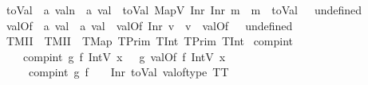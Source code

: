 \begin{isabellebody}
\isanewline
\isanewline
{}\isamarkupfalse%
\ toVal{}\ {\isacharcolon}{\kern0pt}{\isacharcolon}{\kern0pt}\ {\isachardoublequoteopen}{\isacharprime}{\kern0pt}a\ valn\ {\isasymRightarrow}\ {\isacharprime}{\kern0pt}a\ val{}{\isachardoublequoteclose}\ \ {\isachardoublequoteopen}toVal{}\ {\isacharparenleft}{\kern0pt}MapV\ {\isacharparenleft}{\kern0pt}Inr\ {\isacharparenleft}{\kern0pt}Inr\ m{\isacharparenright}{\kern0pt}{\isacharparenright}{\kern0pt}{\isacharparenright}{\kern0pt}\ {\isacharequal}{\kern0pt}\ m{\isachardoublequoteclose}\ {\isacharbar}{\kern0pt}\ {\isachardoublequoteopen}toVal{}\ {\isacharunderscore}{\kern0pt}\ {\isacharequal}{\kern0pt}\ undefined{\isachardoublequoteclose}\isanewline
{}\isamarkupfalse%
\ val{}Of{}{}\ {\isacharcolon}{\kern0pt}{\isacharcolon}{\kern0pt}\ {\isachardoublequoteopen}{\isacharprime}{\kern0pt}a\ val{}{}\ {\isasymRightarrow}\ {\isacharprime}{\kern0pt}a\ val{}{\isachardoublequoteclose}\ \ {\isachardoublequoteopen}val{}Of{}{}\ {\isacharparenleft}{\kern0pt}Inr\ v{}{\isacharparenright}{\kern0pt}\ {\isacharequal}{\kern0pt}\ v{}{\isachardoublequoteclose}\ {\isacharbar}{\kern0pt}\ {\isachardoublequoteopen}val{}Of{}{}\ {\isacharunderscore}{\kern0pt}\ {\isacharequal}{\kern0pt}\ undefined{\isachardoublequoteclose}\isanewline
{}\isamarkupfalse%
\ TMII\ \ {\isachardoublequoteopen}TMII\ {\isasymequiv}\ TMap\ {\isacharparenleft}{\kern0pt}TPrim\ TInt{\isacharparenright}{\kern0pt}\ {\isacharparenleft}{\kern0pt}TPrim\ TInt{\isacharparenright}{\kern0pt}{\isachardoublequoteclose}\isanewline
{}\isamarkupfalse%
\ compint\ \ \isanewline
\ \ \ \ {\isachardoublequoteopen}compint\ g\ f\ {\isacharparenleft}{\kern0pt}IntV{}\ x{\isacharparenright}{\kern0pt}\ {\isacharequal}{\kern0pt}\ \ {\isacharparenleft}{\kern0pt}g\ {\isacharparenleft}{\kern0pt}val{}Of{}{}\ {\isacharparenleft}{\kern0pt}f\ {\isacharparenleft}{\kern0pt}IntV{}\ x{\isacharparenright}{\kern0pt}{\isacharparenright}{\kern0pt}{\isacharparenright}{\kern0pt}{\isacharparenright}{\kern0pt}{\isachardoublequoteclose}\isanewline
\ \ \ \ {\isacharbar}{\kern0pt}\ {\isachardoublequoteopen}compint\ g\ f\ {\isacharunderscore}{\kern0pt}\ {\isacharequal}{\kern0pt}\ \ Inr\ {\isacharparenleft}{\kern0pt}toVal{}\ {\isacharparenleft}{\kern0pt}val{\isacharunderscore}{\kern0pt}of{\isacharunderscore}{\kern0pt}type\ {\isacharparenleft}{\kern0pt}TT{\isacharparenright}{\kern0pt}{\isacharparenright}{\kern0pt}{\isacharparenright}{\kern0pt}{\isachardoublequoteclose}\isanewline

\end{isabellebody}
